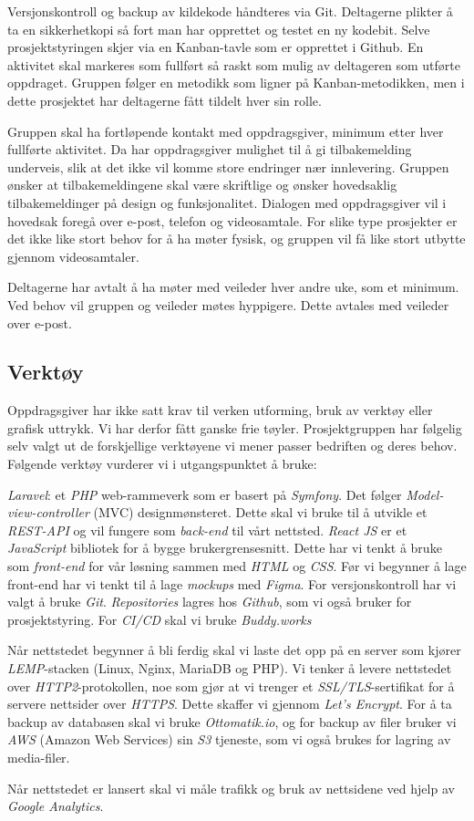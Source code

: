 \documentclass[11pt,a4paper]{report}
\begin{document}
Versjonskontroll og backup av kildekode håndteres via Git. Deltagerne plikter å ta en sikkerhetkopi så fort man har opprettet og testet en ny kodebit. Selve prosjektstyringen skjer via en Kanban-tavle som er opprettet i Github. En aktivitet skal markeres som fullført så raskt som mulig av deltageren som utførte oppdraget. Gruppen følger en metodikk som ligner på Kanban-metodikken, men i dette prosjektet har deltagerne fått tildelt hver sin rolle. 

Gruppen skal ha fortløpende kontakt med oppdragsgiver, minimum etter hver fullførte aktivitet. Da har oppdragsgiver mulighet til å gi tilbakemelding underveis, slik at det ikke vil komme store endringer nær innlevering. Gruppen ønsker at tilbakemeldingene skal være skriftlige og ønsker hovedsaklig tilbakemeldinger på design og funksjonalitet. Dialogen med oppdragsgiver vil i hovedsak foregå over e-post, telefon og videosamtale. For slike type prosjekter er det ikke like stort behov for å ha møter fysisk, og gruppen vil få like stort utbytte gjennom videosamtaler. 

Deltagerne har avtalt å ha møter med veileder hver andre uke, som et minimum. Ved behov vil gruppen og veileder møtes hyppigere. Dette avtales med veileder over e-post.

\subsection*{Verktøy}

Oppdragsgiver har ikke satt krav til verken utforming, bruk av verktøy eller grafisk uttrykk. Vi har derfor fått ganske frie tøyler. Prosjektgruppen har følgelig selv valgt ut de forskjellige verktøyene vi mener passer bedriften og deres behov. Følgende verktøy vurderer vi i utgangspunktet å bruke:

\textit{Laravel}: et \textit{PHP} web-rammeverk som er basert på \textit{Symfony}. Det følger \textit{Model-view-controller} (MVC) designmønsteret. Dette skal vi bruke til å utvikle et \textit{REST-API} og vil fungere som \textit{back-end} til vårt nettsted.
\textit{React JS} er et \textit{JavaScript} bibliotek for å bygge brukergrensesnitt. Dette har vi tenkt å bruke som \textit{front-end} for vår løsning sammen med \textit{HTML} og \textit{CSS}. Før vi begynner å lage front-end har vi tenkt til å lage \textit{mockups} med \textit{Figma}.
For versjonskontroll har vi valgt å bruke \textit{Git}.
\textit{Repositories} lagres hos \textit{Github}, som vi også bruker for prosjektstyring. For  \textit{CI/CD} skal vi bruke \textit{Buddy.works}

Når nettstedet begynner å bli ferdig skal vi laste det opp på en server som kjører \textit{LEMP}-stacken (Linux, Nginx, MariaDB og PHP). Vi tenker å levere nettstedet over \textit{HTTP2}-protokollen, noe som gjør at vi trenger et \textit{SSL/TLS}-sertifikat for å servere nettsider over \textit{HTTPS}. Dette skaffer vi gjennom \textit{Let's Encrypt}. For å ta backup av databasen skal vi bruke \textit{Ottomatik.io}, og for backup av filer bruker vi \textit{AWS} (Amazon Web Services) sin \textit{S3} tjeneste, som vi også brukes for lagring av media-filer.

Når nettstedet er lansert skal vi måle trafikk og bruk av nettsidene ved hjelp av \textit{Google Analytics}.
\end{document}
